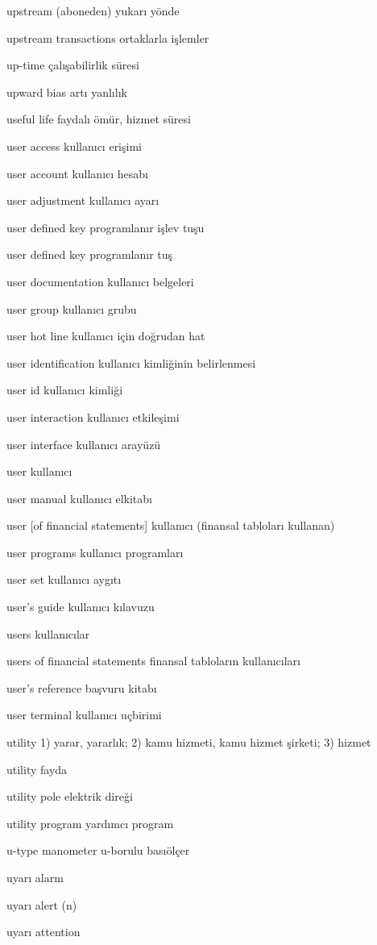 \documentclass[12pt,fleqn]{article}\usepackage{../../common}
\begin{document}
upstream (aboneden) yukarı yönde

upstream transactions ortaklarla işlemler

up-time çalışabilirlik süresi

upward bias artı yanlılık

useful life faydalı ömür, hizmet süresi

user access kullanıcı erişimi

user account kullanıcı hesabı

user adjustment kullanıcı ayarı

user defined key programlanır işlev tuşu

user defined key programlanır tuş

user documentation kullanıcı belgeleri

user group kullanıcı grubu

user hot line kullanıcı için doğrudan hat

user identification kullanıcı kimliğinin belirlenmesi

user id kullanıcı kimliği

user interaction kullanıcı etkileşimi

user interface kullanıcı arayüzü

user kullanıcı

user manual kullanıcı elkitabı

user [of financial statements] kullanıcı (finansal tabloları kullanan)

user programs kullanıcı programları

user set kullanıcı aygıtı

user's guide kullanıcı kılavuzu

users kullanıcılar

users of financial statements finansal tabloların kullanıcıları

user's reference başvuru kitabı

user terminal kullanıcı uçbirimi

utility 1) yarar, yararlık; 2) kamu hizmeti, kamu hizmet şirketi; 3) hizmet

utility fayda

utility pole elektrik direği

utility program yardımcı program

u-type manometer u-borulu basıölçer

uyarı alarm

uyarı alert (n)

uyarı attention
\end{document}
